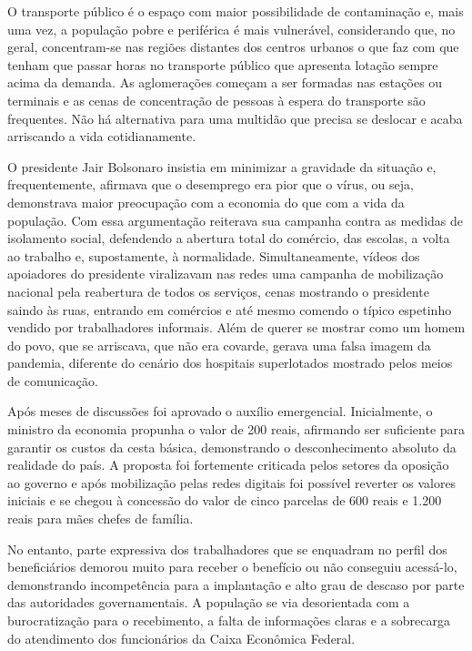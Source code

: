 O transporte público é o espaço com maior possibilidade de
contaminação e, mais uma vez, a população pobre e periférica é mais
vulnerável, considerando que, no geral, concentram-se nas regiões
distantes dos centros urbanos o que faz com que tenham que passar horas
no transporte público que apresenta lotação sempre acima da demanda. As
aglomerações começam a ser formadas nas estações ou terminais e as cenas
de concentração de pessoas à espera do transporte são frequentes. Não há
alternativa para uma multidão que precisa se deslocar e acaba arriscando
a vida cotidianamente.

O presidente Jair Bolsonaro insistia em minimizar a gravidade da
situação e, frequentemente, afirmava que o desemprego era pior que o
vírus, ou seja, demonstrava maior preocupação com a economia do que com
a vida da população. Com essa argumentação reiterava sua campanha contra
as medidas de isolamento social, defendendo a abertura total do
comércio, das escolas, a volta ao trabalho e, supostamente, à
normalidade. Simultaneamente, vídeos dos apoiadores do presidente
viralizavam nas redes uma campanha de mobilização nacional pela
reabertura de todos os serviços, cenas mostrando o presidente saindo às
ruas, entrando em comércios e até mesmo comendo o típico espetinho
vendido por trabalhadores informais. Além de querer se mostrar como um
homem do povo, que se arriscava, que não era covarde, gerava uma falsa
imagem da pandemia, diferente do cenário dos hospitais superlotados
mostrado pelos meios de comunicação.

Após meses de discussões foi aprovado o auxílio emergencial.
Inicialmente, o ministro da economia propunha o valor de 200 reais,
afirmando ser suficiente para garantir os custos da cesta básica,
demonstrando o desconhecimento absoluto da realidade do país. A proposta
foi fortemente criticada pelos setores da oposição ao governo e após
mobilização pelas redes digitais foi possível reverter os valores
iniciais e se chegou à concessão do valor de cinco parcelas de 
600 reais e 1.200 reais para mães chefes de família.

No entanto, parte expressiva dos trabalhadores que se enquadram no
perfil dos beneficiários demorou muito para receber o benefício ou não
conseguiu acessá-lo, demonstrando incompetência para a implantação e
alto grau de descaso por parte das autoridades governamentais. A
população se via desorientada com a burocratização para o recebimento, a
falta de informações claras e a sobrecarga do atendimento dos
funcionários da Caixa Econômica Federal.

